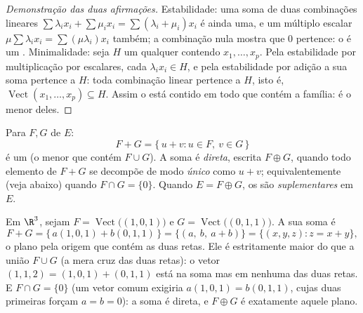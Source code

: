 \begin{proof}[Demonstração das duas afirmações]
Estabilidade: uma soma de duas combinações lineares $\sum\lambda_i x_i +
\sum\mu_i x_i = \sum(\lambda_i + \mu_i)x_i$ é ainda
uma, e um múltiplo escalar $\mu\sum\lambda_i x_i = \sum(\mu\lambda_i)
x_i$ também; a combinação nula mostra que
$0$ pertence: o  é um . Minimalidade: seja $H$
um  qualquer contendo $x_1,
\dots, x_p$. Pela estabilidade por
multiplicação por escalares, cada $\lambda_i x_i \in H$, e pela estabilidade por
adição a sua soma pertence a $H$: toda combinação linear pertence a
$H$, isto é, $\operatorname{Vect}(x_1, \dots, x_p) \subseteq H$. Assim o  está
contido em todo  que contém a família: é o menor deles.
\end{proof}

\begin{definition}\label{def:b1:vspaces:sum}
Para  $F, G$ de $E$:
\[
F + G = \{\,u + v : u \in F,\ v \in G\,\}
\]
é um  (o menor que contém $F \cup G$). A soma é
\emph{direta}, escrita $F \oplus G$, quando todo
elemento de $F + G$ se decompõe de modo \emph{único} como $u + v$;
equivalentemente (veja abaixo) quando $F \cap G = \{0\}$. Quando $E = F \oplus
G$, os
 são \emph{suplementares}
em $E$.
\end{definition}

\begin{example}
\label{ex:b1:vspaces:sumoflines}
Em $\R^3$, sejam $F = \operatorname{Vect}\bigl((1,0,1)\bigr)$ e
$G = \operatorname{Vect}\bigl((0,1,1)\bigr)$. A sua soma é
\[
F + G = \{\,a(1,0,1) + b(0,1,1)\,\}
= \{(a,\ b,\ a + b)\} = \{(x, y, z) : z = x + y\},
\]
o plano pela origem que contém as duas retas. Ele é estritamente
maior do que a união $F \cup G$ (a mera cruz das duas retas): o vetor
$(1, 1, 2) = (1,0,1) + (0,1,1)$ está na soma mas em nenhuma das duas retas. E $F \cap G = \{0\}$ (um vetor
comum exigiria $a(1,0,1) = b(0,1,1)$, cujas duas primeiras  forçam $a = b = 0$):
a soma é direta, e $F \oplus
G$ é exatamente aquele plano.
\end{example}

